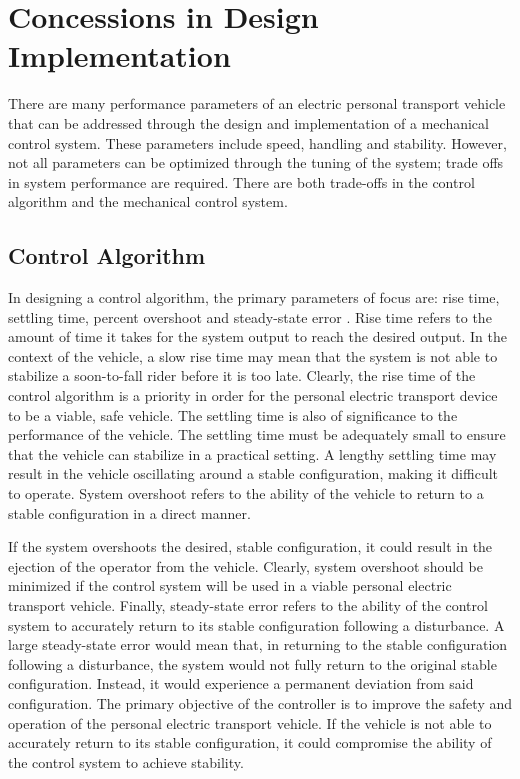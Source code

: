 \section{Concessions in Design Implementation} \label{sec:Tradeoff}
There are many performance parameters of an electric personal transport vehicle that can be addressed through the design and implementation of a mechanical control system. 
These parameters include speed, handling and stability. 
However, not all parameters can be optimized through the tuning of the system; trade offs in system performance are required. 
There are both trade-offs in the control algorithm and the mechanical control system.

\subsection{Control Algorithm}                                                                                                                         
In designing a control algorithm, the primary parameters of focus are: rise time, settling time, percent overshoot and steady-state error \cite{Bees}. 
Rise time refers to the amount of time it takes for the system output to reach the desired output. 
In the context of the vehicle, a slow rise time may mean that the system is not able to stabilize a soon-to-fall rider before it is too late. 
Clearly, the rise time of the control algorithm is a priority in order for the personal electric transport device to be a viable, safe vehicle.
The settling time is also of significance to the performance of the vehicle. 
The settling time must be adequately small to ensure that the vehicle can stabilize in a practical setting. 
A lengthy settling time may result in the vehicle oscillating around a stable configuration, making it difficult to operate. 
System overshoot refers to the ability of the vehicle to return to a stable configuration in a direct manner. 

If the system overshoots the desired, stable configuration, it could result in the ejection of the operator from the vehicle. 
Clearly, system overshoot should be minimized if the control system will be used in a viable personal electric transport vehicle. 
Finally, steady-state error refers to the ability of the control system to accurately return to its stable configuration following a disturbance. 
A large steady-state error would mean that, in returning to the stable configuration following a disturbance, the system would not fully return to the original stable configuration. 
Instead, it would experience a permanent deviation from said configuration. 
The primary objective of the controller is to improve the safety and operation of the personal electric transport vehicle.                             
If the vehicle is not able to accurately return to its stable configuration, it could compromise the ability of the control system to achieve stability.


